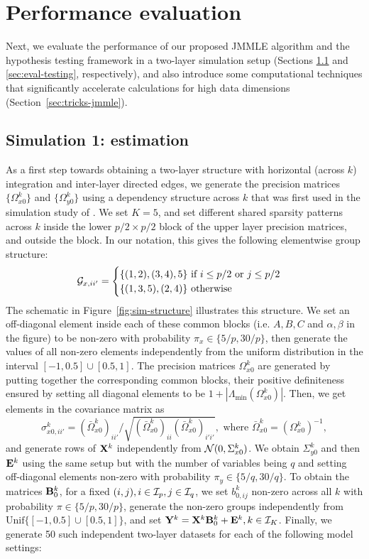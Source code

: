 \section{Performance evaluation}
\label{sec:sec4}
Next, we evaluate the performance of our proposed JMMLE algorithm and the hypothesis testing framework in a two-layer simulation setup (Sections \ref{sec:eval-jmmle} and \ref{sec:eval-testing}, respectively), and also introduce some computational techniques that significantly accelerate calculations for high data dimensions (Section~\ref{sec:tricks-jmmle}).

\subsection{Simulation 1: estimation}
\label{sec:eval-jmmle}
As a first step towards obtaining a two-layer structure with horizontal (across $k$) integration and inter-layer directed edges, we generate the precision matrices $\{ \Omega_{x0}^k \}$ and $\{ \Omega_{y0}^k \}$ using a dependency structure across $k$ that was first used in the simulation study of \citet{MaMichailidis15}. We set $K=5$, and set different shared sparsity patterns across $k$ inside the lower $p/2 \times p/2$ block of the upper layer precision matrices, and outside the block. In our notation, this gives the following elementwise group structure:
%
$$
{\cal{G}}_{x,ii'} = \begin{cases}
\{ (1,2),(3,4), 5 \} \text{ if } i \leq p/2 \text{ or } j \leq p/2\\
\{ (1,3,5),(2,4) \} \text{ otherwise }
\end{cases}
$$
%
The schematic in Figure~\ref{fig:sim-structure} illustrates this structure. We set an off-diagonal element inside each of these common blocks (i.e. $A,B,C$ and $\alpha, \beta$ in the figure) to be non-zero with probability $\pi_x \in \{ 5/p, 30/p \}$, then generate the values of all non-zero elements independently from the uniform distribution in the interval $[-1, 0.5] \cup [0.5, 1]$. The precision matrices $\Omega_{x0}^k$ are generated by putting together the corresponding common blocks, their positive definiteness ensured by setting all diagonal elements to be $1 + |\Lambda_{\min} (\Omega_{x0}^k)|$. Then, we get elements in the covariance matrix as
%
$$
\sigma_{x0,ii'}^k = (\bar \Omega_{x0}^k)_{ii'} / \sqrt{(\bar \Omega_{x0}^k)_{ii} (\bar \Omega_{x0}^k)_{i'i'} },
\text{ where } \bar \Omega_{x0}^k = (\Omega_{x0}^k)^{-1},
$$
and generate rows of ${\mathbf{X}}^k$ independently from ${\cal{N}}(0, \Sigma_{x0}^k)$. We obtain $\Sigma_{y0}^k$ and then ${\mathbf{E}}^k$ using the same setup but with the number of variables being $q$ and setting off-diagonal elements non-zero with probability $\pi_y \in \{ 5/q, 30/q \}$. To obtain the matrices ${\mathbf{B}}_0^k$, for a fixed $(i,j), i \in {\cal{I}}_p, j \in {\cal{I}}_q$, we set $b_{0,ij}^k$ non-zero across all $k$ with probability $\pi \in \{ 5/p, 30/p \}$, generate the non-zero groups independently from $\text{Unif} \{ [-1, 0.5] \cup [0.5, 1] \}$, and set ${\mathbf{Y}}^k = {\mathbf{X}}^k {\mathbf{B}}_0^k + {\mathbf{E}}^k, k \in {\cal{I}}_K$. Finally, we generate 50 such independent two-layer datasets for each of the following model settings:

